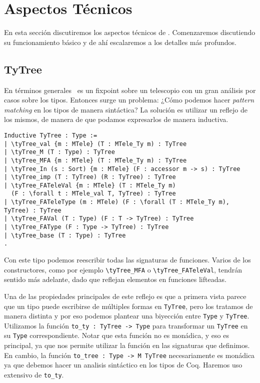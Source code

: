 \section{Aspectos Técnicos}

En esta sección discutiremos los aspectos técnicos de \lift.
Comenzaremos discutiendo su funcionamiento básico y de ahí escalaremos a los detalles más profundos. 

\subsection{TyTree}

En términos generales \lift\ es un fixpoint sobre un telescopio con un gran análisis por casos sobre los tipos.
Entonces surge un problema: ¿Cómo podemos hacer \textit{pattern matching} en los tipos de manera sintáctica?
La solución es utilizar un reflejo de los mismos, de manera de que podamos expresarlos de manera inductiva.

\begin{lstlisting}
Inductive TyTree : Type :=
| \tyTree_val {m : MTele} (T : MTele_Ty m) : TyTree
| \tyTree_M (T : Type) : TyTree
| \tyTree_MFA {m : MTele} (T : MTele_Ty m) : TyTree
| \tyTree_In (s : Sort) {m : MTele} (F : accessor m -> s) : TyTree
| \tyTree_imp (T : TyTree) (R : TyTree) : TyTree
| \tyTree_FATeleVal {m : MTele} (T : MTele_Ty m)
  (F : \forall t : MTele_val T, TyTree) : TyTree
| \tyTree_FATeleType (m : MTele) (F : \forall (T : MTele_Ty m), TyTree) : TyTree
| \tyTree_FAVal (T : Type) (F : T -> TyTree) : TyTree
| \tyTree_FAType (F : Type -> TyTree) : TyTree
| \tyTree_base (T : Type) : TyTree
.
\end{lstlisting}

Con este tipo podemos reescribir todas las signaturas de funciones. Varios de los constructores, como por ejemplo
\lstinline{\tyTree_MFA} o \lstinline{\tyTree_FATeleVal}, tendrán sentido más adelante, dado que reflejan elementos en
funciones lifteadas.

Una de las propiedades principales de este reflejo es que a primera vista parece que un tipo puede escribirse de múltiples formas en \lstinline{TyTree}, pero los tratamos de manera distinta y por eso podemos plantear una biyección
entre \lstinline{Type} y \lstinline{TyTree}. Utilizamos la función \lstinline{to_ty : TyTree -> Type} para transformar un \lstinline{TyTree} en su \lstinline{Type} correspondiente. Notar que esta función no es monádica, y eso es principal, ya que nos permite utilizar la función en las signaturas que definimos. En cambio, la función \lstinline{to_tree : Type -> M TyTree} necesariamente es monádica ya que debemos hacer un analisis sintáctico en los tipos de Coq. Haremos uso extensivo de \lstinline{to_ty}.

